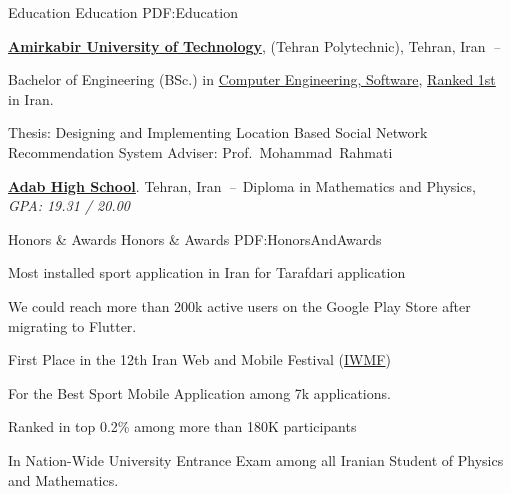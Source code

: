 \documentclass[letterpaper,MMMyyyy,nonstopmode]{resume}
\begin{document}
\begin{Body}

\Section
{Education}
{Education}
{PDF:Education}

\Entry
\href{https://aut.ac.ir/en}
{\textbf{Amirkabir University of Technology}},
{\small{(Tehran Polytechnic), Tehran, Iran}}
\hfill
\textsl{\small{\,--\,}}

\Gap
\BulletItem
Bachelor of Engineering (BSc.) in
\href{https://ce.aut.ac.ir/en}
{Computer Engineering, Software},
\href{https://ur.isc.ac/#Technology?input_culture=en}
{Ranked 1st}
in Iran.
\begin{Detail}
\SubBulletItem
Thesis:
Designing and Implementing Location Based Social Network
Recommendation System
\SubBulletItem
Adviser:
Prof.~Mohammad~Rahmati
\end{Detail}

\BigGap
\Entry
\href{http://adab.sch.ir/HSchool}
{\textbf{Adab High School}}.
{\small{Tehran, Iran}}
\hfill
\textsl{\small{\,--\,}}
\Gap
\BulletItem
Diploma in Mathematics and Physics, {\small{\textsl{GPA: 19.31 / 20.00}}}


\Section
{Honors \&\newline
Awards}
{Honors \& Awards}
{PDF:HonorsAndAwards}

\BulletItem
Most installed sport application in Iran for Tarafdari application
\hfill
\textsl{\small{}}
\begin{Detail}
\SubBulletItem
We could reach more than 200k active users on the
Google Play Store after migrating to Flutter.
\end{Detail}

\Gap
\BulletItem
First Place in the 12th Iran Web and Mobile Festival
(\href{https://iwmf.ir}
{\small{IWMF}})
\hfill
\textsl{\small{}}
\begin{Detail}
\SubBulletItem
For the Best Sport Mobile Application among 7k applications.
\end{Detail}

\Gap
\BulletItem
Ranked in top 0.2\% among more than 180K participants
\hfill
\textsl{\small{}}
\begin{Detail}
\SubBulletItem
In Nation-Wide University Entrance Exam among
all Iranian Student of Physics and Mathematics.
\end{Detail}


\end{Body}
\end{document}

